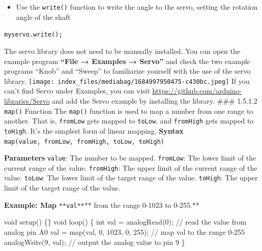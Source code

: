 \documentclass[
  letterpaper,
  DIV=11,
  numbers=noendperiod]{scrreprt}
\newenvironment{Shaded}{\begin{snugshade}}{\end{snugshade}}
\newcommand{\CommentTok}[1]{\textcolor[rgb]{0.37,0.37,0.37}{#1}}
\newcommand{\DataTypeTok}[1]{\textcolor[rgb]{0.68,0.00,0.00}{#1}}
\newcommand{\DecValTok}[1]{\textcolor[rgb]{0.68,0.00,0.00}{#1}}
\newcommand{\NormalTok}[1]{\textcolor[rgb]{0.00,0.23,0.31}{#1}}
\newcommand{\OperatorTok}[1]{\textcolor[rgb]{0.37,0.37,0.37}{#1}}
\providecommand{\tightlist}{%
  \setlength{\itemsep}{0pt}\setlength{\parskip}{0pt}}\usepackage{longtable,booktabs,array}
\begin{document}
\begin{itemize}
\tightlist
\item
  Use the \texttt{write()} function to write the angle to the servo,
  setting the rotation angle of the shaft
\end{itemize}

\texttt{myservo.write();}

The servo library does not need to be manually installed. You can open
the example program \textbf{``File → Examples → Servo''} and check the
two example programs ``Knob'' and ``Sweep'' to familiarize yourself with
the use of the servo library.
\texttt{[image: index\_files/mediabag/1684997950475-c430bc.jpeg]} If you
can't find Servo under Examples, you can visit
\url{https://github.com/arduino-libraries/Servo} and add the Servo
example by installing the library. \#\#\# 1.5.1.2 \texttt{map()}
Function The \texttt{map()} function is used to map a number from one
range to another. That is, \texttt{fromLow} gets mapped to
\texttt{toLow}, and \texttt{fromHigh} gets mapped to \texttt{toHigh}.
It's the simplest form of linear mapping. \textbf{Syntax}
\texttt{map(value,\ fromLow,\ fromHigh,\ toLow,\ toHigh)}

\textbf{Parameters} \texttt{value}: The number to be mapped.
\texttt{fromLow}: The lower limit of the current range of the value.
\texttt{fromHigh}: The upper limit of the current range of the value.
\texttt{toLow}: The lower limit of the target range of the value.
\texttt{toHigh}: The upper limit of the target range of the value.

\textbf{Example: Map} \texttt{**val**}** from the range 0-1023 to
0-255.**

\begin{Shaded}
\begin{Highlighting}[]
\DataTypeTok{void}\NormalTok{ setup}\OperatorTok{()} \OperatorTok{\{\}}
\DataTypeTok{void}\NormalTok{ loop}\OperatorTok{()} \OperatorTok{\{}
    \DataTypeTok{int}\NormalTok{ val }\OperatorTok{=}\NormalTok{ analogRead}\OperatorTok{(}\DecValTok{0}\OperatorTok{);} \CommentTok{// read the value from analog pin A0}
\NormalTok{    val }\OperatorTok{=}\NormalTok{ map}\OperatorTok{(}\NormalTok{val}\OperatorTok{,} \DecValTok{0}\OperatorTok{,} \DecValTok{1023}\OperatorTok{,} \DecValTok{0}\OperatorTok{,} \DecValTok{255}\OperatorTok{);} \CommentTok{// map val to the range 0{-}255}
\NormalTok{    analogWrite}\OperatorTok{(}\DecValTok{9}\OperatorTok{,}\NormalTok{ val}\OperatorTok{);} \CommentTok{// output the analog value to pin 9}
\OperatorTok{\}}
\end{Highlighting}
\end{Shaded}
\end{document}

